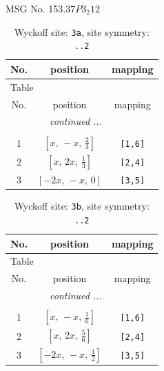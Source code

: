 \documentclass[fleqn,8pt]{jsarticle}
\begin{document}
\setcounter{MaxMatrixCols}{32}

\renewcommand{\tablename}{Table~}
\renewcommand{\figurename}{Figure~}
\begin{center}
\LARGE
MSG No. 153.37\quad$P3_{2}12$
\end{center}
\renewcommand{\arraystretch}{1.2}
\begin{longtable}{ccc}
\caption{Wyckoff site: {\tt 3a}, site symmetry: {\tt ..2}}
 \\
 \hline \hline
No. & position & mapping \\ \hline \endfirsthead

\multicolumn{2}{l}{\tablename\ \thetable{}} \\
 \hline \hline
No. & position & mapping \\ \hline \endhead

 \hline \hline
\multicolumn{2}{r}{\footnotesize\it continued ...} \\ \endfoot

 \hline \hline
\multicolumn{2}{r}{} \\ \endlastfoot

1 & $\left[ x,\, - x,\, \frac{2}{3} \right]$ & {\tt [1,6]} \\ \hline
2 & $\left[ x,\, 2 x,\, \frac{1}{3} \right]$ & {\tt [2,4]} \\ \hline
3 & $\left[ - 2 x,\, - x,\, 0 \right]$ & {\tt [3,5]} \\
\end{longtable}
\renewcommand{\arraystretch}{1.2}
\begin{longtable}{ccc}
\caption{Wyckoff site: {\tt 3b}, site symmetry: {\tt ..2}}
 \\
 \hline \hline
No. & position & mapping \\ \hline \endfirsthead

\multicolumn{2}{l}{\tablename\ \thetable{}} \\
 \hline \hline
No. & position & mapping \\ \hline \endhead

 \hline \hline
\multicolumn{2}{r}{\footnotesize\it continued ...} \\ \endfoot

 \hline \hline
\multicolumn{2}{r}{} \\ \endlastfoot

1 & $\left[ x,\, - x,\, \frac{1}{6} \right]$ & {\tt [1,6]} \\ \hline
2 & $\left[ x,\, 2 x,\, \frac{5}{6} \right]$ & {\tt [2,4]} \\ \hline
3 & $\left[ - 2 x,\, - x,\, \frac{1}{2} \right]$ & {\tt [3,5]} \\
\end{longtable}
\end{document}
